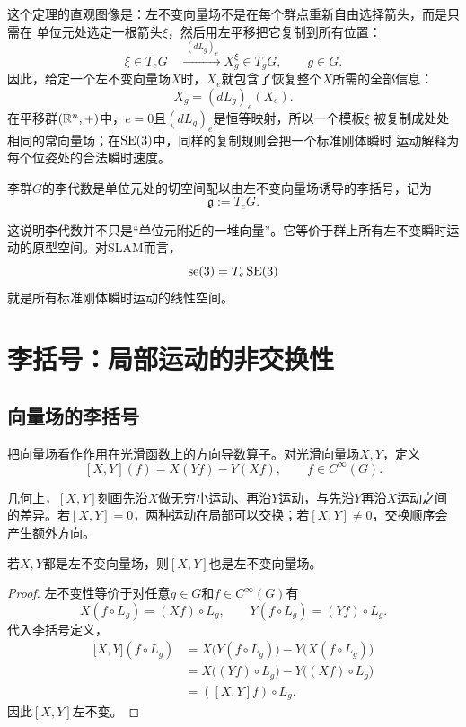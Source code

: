 这个定理的直观图像是：左不变向量场不是在每个群点重新自由选择箭头，而是只需在
单位元处选定一根箭头$\xi$，然后用左平移把它复制到所有位置：
\[
\xi\in T_eG
\quad\xrightarrow{\ (dL_g)_e\ }
X_g^\xi\in T_gG,
\qquad g\in G.
\]
因此，给定一个左不变向量场$X$时，$X_e$就包含了恢复整个$X$所需的全部信息：
\[
    X_g=(dL_g)_e(X_e).
\]
在平移群$(\mathbb{R}^n,+)$中，$e=0$且$(dL_g)_e$是恒等映射，所以一个模板$\xi$
被复制成处处相同的常向量场；在$\operatorname{SE}(3)$中，同样的复制规则会把一个标准刚体瞬时
运动解释为每个位姿处的合法瞬时速度。

\begin{definition}[李代数]
李群$G$的李代数是单位元处的切空间配以由左不变向量场诱导的李括号，记为
\[
    \mathfrak g:=T_eG.
\]
\end{definition}

这说明李代数并不只是“单位元附近的一堆向量”。它等价于群上所有左不变瞬时运动的原型空间。对SLAM而言，
\[
    \operatorname{se}(3)=T_e\operatorname{SE}(3)
\]
就是所有标准刚体瞬时运动的线性空间。


\section{李括号：局部运动的非交换性}

\subsection{向量场的李括号}

\begin{definition}[向量场李括号]
把向量场看作作用在光滑函数上的方向导数算子。对光滑向量场$X,Y$，定义
\[
    [X,Y](f)=X(Yf)-Y(Xf),
    \qquad f\in C^\infty(G).
\]
\end{definition}

几何上，$[X,Y]$刻画先沿$X$做无穷小运动、再沿$Y$运动，与先沿$Y$再沿$X$运动之间的差异。若$[X,Y]=0$，两种运动在局部可以交换；若$[X,Y]\neq0$，交换顺序会产生额外方向。

\begin{proposition}[左不变向量场对李括号封闭]
若$X,Y$都是左不变向量场，则$[X,Y]$也是左不变向量场。
\end{proposition}

\begin{proof}
左不变性等价于对任意$g\in G$和$f\in C^\infty(G)$有
\[
    X(f\circ L_g)=(Xf)\circ L_g,
    \qquad
    Y(f\circ L_g)=(Yf)\circ L_g.
\]
代入李括号定义，
\[
\begin{aligned}
    \bigl[X,Y\bigr](f\circ L_g)
    &=X\bigl(Y(f\circ L_g)\bigr)-Y\bigl(X(f\circ L_g)\bigr)\\
    &=X\bigl((Yf)\circ L_g\bigr)-Y\bigl((Xf)\circ L_g\bigr)\\
    &=([X,Y]f)\circ L_g.
\end{aligned}
\]
因此$[X,Y]$左不变。
\end{proof}

